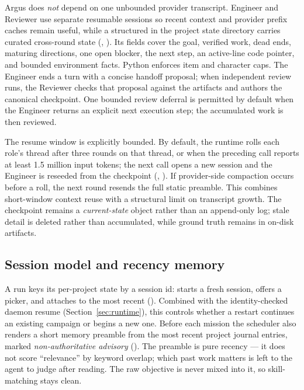 Argus does \emph{not} depend on one unbounded provider transcript. Engineer and
Reviewer use separate resumable sessions so recent context and provider prefix
caches remain useful, while a structured  in the project
state directory carries curated cross-round state
(, ). Its
 fields cover the goal, verified work, dead ends, maturing
directions, one open blocker, the next step, an active-line code pointer, and
bounded environment facts. Python enforces item and character caps. The Engineer
ends a turn with a concise handoff proposal; when independent review runs, the
Reviewer checks that proposal against the artifacts and authors the canonical
checkpoint. One bounded review deferral is permitted by default when the Engineer
returns an explicit next execution step; the accumulated work is then reviewed.

The resume window is explicitly bounded. By default, the runtime rolls each role's
thread after three rounds on that thread, or when the preceding call reports at
least 1.5 million input tokens; the next call opens a new session and the Engineer
is reseeded from the checkpoint (,
). If provider-side compaction occurs before a roll, the
next round resends the full static preamble. This combines short-window context
reuse with a structural limit on transcript growth. The checkpoint remains a
\emph{current-state} object rather than an append-only log; stale detail is
deleted rather than accumulated, while ground truth remains in on-disk artifacts.

\subsection{Session model and recency memory}

A run keys its per-project state by a session id:  starts a fresh
session,  offers a picker, and  attaches to
the most recent (). Combined with the identity-checked
daemon resume (Section~\ref{sec:runtime}), this controls whether a restart
continues an existing campaign or begins a new one. Before each mission the
scheduler also renders a short memory preamble from the most recent project journal
entries, marked \emph{non-authoritative advisory} (). The
preamble is pure recency --- it does not score ``relevance'' by keyword overlap;
which past work matters is left to the agent to judge after reading. The raw
objective is never mixed into it, so skill-matching stays clean.

